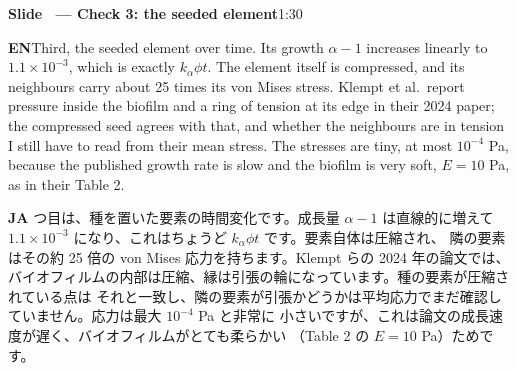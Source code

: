 \documentclass[11pt,a4paper]{article}
\newcounter{sl}
\newcommand{\slide}[2]{\stepcounter{sl}\vspace{8pt}%
  {\color{c3}\large\bfseries Slide \thesl\ --- #1}\hfill{\small #2}\par\vspace{2pt}}
\newcommand{\EN}{\textbf{EN}\quad}
\newcommand{\JA}{\par\textbf{JA}\quad}
\begin{document}
\slide{Check 3: the seeded element}{1:30}
\EN Third, the seeded element over time. Its growth $\alpha-1$ increases linearly to
$1.1\times10^{-3}$, which is exactly $k_\alpha\phi t$. The element itself is
compressed, and its neighbours carry about 25 times its von Mises stress.
Klempt et al.\ report pressure inside the biofilm and a ring of tension at its
edge in their 2024 paper; the compressed seed agrees with that, and whether the
neighbours are in tension I still have to read from their mean stress. The stresses are tiny, at most $10^{-4}$ Pa, because the published
growth rate is slow and the biofilm is very soft, $E=10$ Pa, as in their
Table 2.
\JA 3 つ目は、種を置いた要素の時間変化です。成長量 $\alpha-1$ は直線的に増えて
$1.1\times10^{-3}$ になり、これはちょうど $k_\alpha\phi t$ です。要素自体は圧縮され、
隣の要素はその約 25 倍の von Mises 応力を持ちます。Klempt らの 2024 年の論文では、
バイオフィルムの内部は圧縮、縁は引張の輪になっています。種の要素が圧縮されている点は
それと一致し、隣の要素が引張かどうかは平均応力でまだ確認していません。応力は最大 $10^{-4}$ Pa と非常に
小さいですが、これは論文の成長速度が遅く、バイオフィルムがとても柔らかい
（Table 2 の $E=10$ Pa）ためです。
\end{document}
